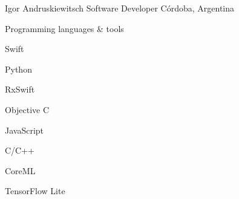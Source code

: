 \documentclass{curriculum}
\begin{document}

\begin{cvheader}

\makeheader
    {Igor Andruskiewitsch}  {}
    {Software Developer}    {}
    {Córdoba, Argentina}    {}

\end{cvheader}


\begin{cvsection}{Programming languages \& tools}
    \begin{colsectionitemlist}{5}

    \item{Swift}
    \item{Python}
    \item{RxSwift}
    \item{Objective C}
    \item{JavaScript}
    \item{C/C++}
    \item{CoreML}
    \item{TensorFlow Lite}

    \end{colsectionitemlist}
\end{cvsection}

\end{document}
